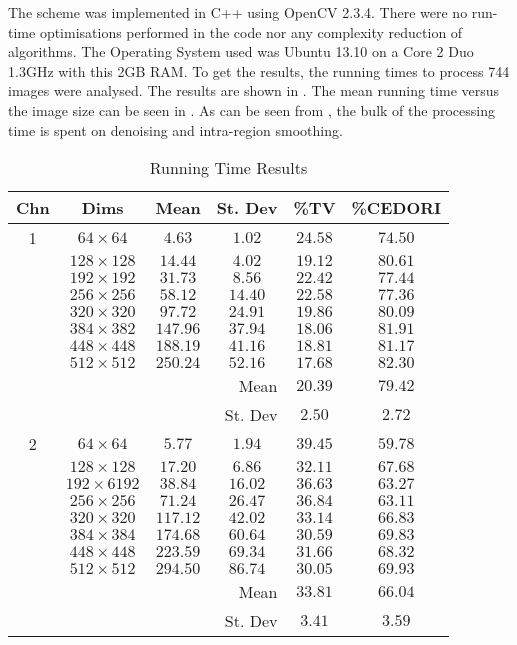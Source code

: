 \begin{definition}
	The scheme was implemented in C++ using OpenCV 2.3.4. There were no run-time optimisations performed in the code nor any complexity reduction of algorithms. The Operating System used was Ubuntu 13.10 on a Core 2 Duo 1.3GHz with this 2GB RAM. To get the results, the running times to process 744 images  were analysed. The results are shown in . The mean running time versus the image size can be seen in . As can be seen from , the bulk of the processing time is spent on denoising and intra-region smoothing.
	
	\begin{table}[!h]
		\renewcommand{\arraystretch}{1.3}
		\caption{Running Time Results}
		\label{tab:results_runningtime}
		\centering
		\begin{tabular}{|c|c|c|c|c|c|}
			\hline
			Chn		& Dims 		& Mean	& St. Dev	& \%TV	& \%CEDORI \\ \hline
			1 			& $64\times64$	& $4.63$	& $1.02$	& $24.58$& $74.50$\\
			& $128\times128$	& $14.44$& $4.02$& $19.12$& $80.61$ \\
			& $192\times192$	& $31.73$& $8.56$& $22.42$& $77.44$ \\
			& $256\times256$	& $58.12$& $14.40$& $22.58$& $77.36$ \\
			& $320\times320$	& $97.72$& $24.91$& $19.86$& $80.09$ \\
			& $384\times382$	& $147.96$& $37.94$& $18.06$& $81.91$ \\
			& $448\times448$	& $188.19$& $41.16$& $18.81$& $81.17$ \\
			& $512\times512$	& $250.24$& $52.16$& $17.68$& $82.30$ \\
			\hline
			\multicolumn{4}{|r}{Mean} & $20.39$ & $79.42$ \\
			\multicolumn{4}{|r}{St. Dev} & $2.50$ & $2.72$ \\
			\hline
			
			2 		 	& $64\times64$	&$5.77$	 &$1.94$	 &$39.45$& $59.78$ \\
			& $128\times128$	&$17.20$	 &$6.86$ &$32.11$& $67.68$ \\
			& $192\times6192$&$38.84$	 &$16.02$&$36.63$& $63.27$ \\          			
			& $256\times256$	&$71.24$	 &$26.47$&$36.84$& $63.11$ \\
			& $320\times320$ &$117.12$&$42.02$&$33.14$	& $66.83$ \\
			& $384\times384$ &$174.68$&$60.64$&$30.59$	& $69.83$ \\
			& $448\times448$ &$223.59$&$69.34$&$31.66$	& $68.32$ \\
			& $512\times512$ &$294.50$&$86.74$&$30.05$	& $69.93$ \\
			\hline
			\multicolumn{4}{|r}{Mean} & $33.81$ & $66.04$ \\
			\multicolumn{4}{|r}{St. Dev} & $3.41$ & $3.59$ \\
			\hline
			

\end{tabular}
\end{table}
\end{definition}
